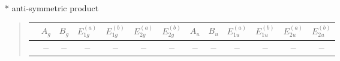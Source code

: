 \documentclass[fleqn,8pt,landscape]{jsarticle}
\begin{document}
* anti-symmetric product
\begin{quote}
\begin{tabular}{ccccccccccccc} \hline \hline
 & $ A_{g} $ & $ B_{g} $ & $ E_{1g}^{(a)} $ & $ E_{1g}^{(b)} $ & $ E_{2g}^{(a)} $ & $ E_{2g}^{(b)} $ & $ A_{u} $ & $ B_{u} $ & $ E_{1u}^{(a)} $ & $ E_{1u}^{(b)} $ & $ E_{2u}^{(a)} $ & $ E_{2u}^{(b)} $ \\ \hline
$  $ & $ - $ & $ - $ & $ - $ & $ - $ & $ - $ & $ - $ & $ - $ & $ - $ & $ - $ & $ - $ & $ - $ & $ - $ \\
 \hline \hline
\end{tabular}
\end{quote}
\end{document}
